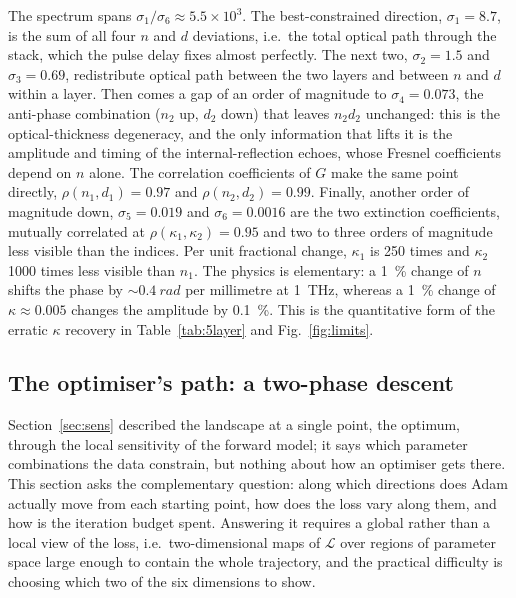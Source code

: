 \documentclass{optica-article}
\newcommand{\kap}{\kappa}
\newcommand{\Lt}{\mathcal{L}}
\begin{document}
The spectrum spans $\sigma_1/\sigma_6\approx5.5\times10^3$. The best-constrained direction, $\sigma_1=8.7$, is the sum of all four $n$ and $d$ deviations, i.e.\ the total optical path through the stack, which the pulse delay fixes almost perfectly. The next two, $\sigma_2=1.5$ and $\sigma_3=0.69$, redistribute optical path between the two layers and between $n$ and $d$ within a layer. Then comes a gap of an order of magnitude to $\sigma_4=0.073$, the anti-phase combination ($n_2$ up, $d_2$ down) that leaves $n_2d_2$ unchanged: this is the optical-thickness degeneracy, and the only information that lifts it is the amplitude and timing of the internal-reflection echoes, whose Fresnel coefficients depend on $n$ alone. The correlation coefficients of $G$ make the same point directly, $\rho(n_1,d_1)=0.97$ and $\rho(n_2,d_2)=0.99$. Finally, another order of magnitude down, $\sigma_5=0.019$ and $\sigma_6=0.0016$ are the two extinction coefficients, mutually correlated at $\rho(\kap_1,\kap_2)=0.95$ and two to three orders of magnitude less visible than the indices. Per unit fractional change, $\kap_1$ is 250 times and $\kap_2$ 1000 times less visible than $n_1$. The physics is elementary: a \SI{1}{\percent} change of $n$ shifts the phase by $\sim\SI{0.4}{rad}$ per millimetre at \SI{1}{THz}, whereas a \SI{1}{\percent} change of $\kap\approx0.005$ changes the amplitude by \SI{0.1}{\percent}. This is the quantitative form of the erratic $\kap$ recovery in Table~\ref{tab:5layer} and Fig.~\ref{fig:limits}.

\subsection{The optimiser's path: a two-phase descent}\label{sec:pca}
Section~\ref{sec:sens} described the landscape at a single point, the optimum, through the local sensitivity of the forward model; it says which parameter combinations the data constrain, but nothing about how an optimiser gets there. This section asks the complementary question: along which directions does Adam actually move from each starting point, how does the loss vary along them, and how is the iteration budget spent. Answering it requires a global rather than a local view of the loss, i.e.\ two-dimensional maps of $\Lt$ over regions of parameter space large enough to contain the whole trajectory, and the practical difficulty is choosing which two of the six dimensions to show.
\end{document}
